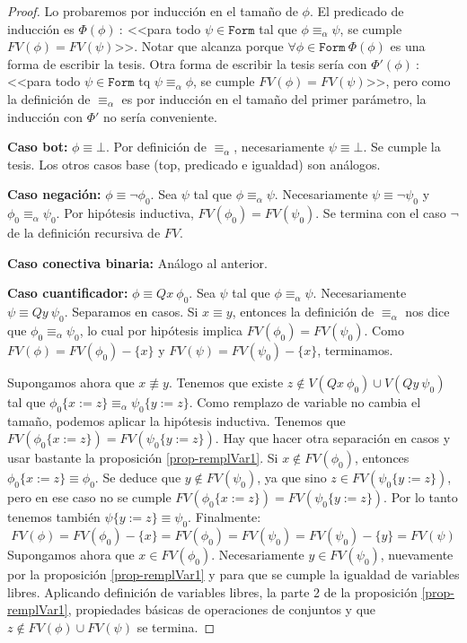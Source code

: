 \documentclass[a4paper, 12pt]{report}
\theoremstyle{definition}
\begin{document}
\begin{proof}
	Lo probaremos por inducción en el tamaño de $\phi$. El predicado de inducción es $\Phi(\phi)~:~$<<para todo $\psi\in\mathtt{Form}$ tal que $\phi\equiv_\alpha\psi$, se cumple $FV(\phi)=FV(\psi)$>>. Notar que alcanza porque $\forall \phi\in\mathtt{Form}~\Phi(\phi)$ es una forma de escribir la tesis. Otra forma de escribir la tesis sería con $\Phi'(\phi)~:~$<<para todo $\psi\in\mathtt{Form}$ tq $\psi\equiv_\alpha\phi$, se cumple $FV(\phi)=FV(\psi)$>>, pero como la definición de $\equiv_\alpha$ es por inducción en el tamaño del primer parámetro, la inducción con $\Phi'$ no sería conveniente.
	
	\textbf{Caso bot:} $\phi\equiv\bot$. Por definición de $\equiv_\alpha$, necesariamente $\psi\equiv\bot$. Se cumple la tesis. Los otros casos base (top, predicado e igualdad) son análogos.
	
	\textbf{Caso negación:} $\phi\equiv\lnot\phi_0$. Sea $\psi$ tal que $\phi\equiv_\alpha\psi$. Necesariamente $\psi\equiv \lnot\psi_0$ y $\phi_0\equiv_\alpha\psi_0$. Por hipótesis inductiva, $FV(\phi_0)=FV(\psi_0)$. Se termina con el caso $\lnot$ de la definición recursiva de $FV$.
	
	\textbf{Caso conectiva binaria:} Análogo al anterior.
	
	\textbf{Caso cuantificador:} $\phi\equiv Qx~\phi_0$. Sea $\psi$ tal que $\phi\equiv_\alpha\psi$. Necesariamente $\psi\equiv Qy~\psi_0$. Separamos en casos. Si $x\equiv y$, entonces la definición de $\equiv_\alpha$ nos dice que $\phi_0\equiv_\alpha\psi_0$, lo cual por hipótesis implica $FV(\phi_0)=FV(\psi_0)$. Como $FV(\phi) = FV(\phi_0)-\{x\}$ y $FV(\psi) = FV(\psi_0)-\{x\}$, terminamos.
	
	Supongamos ahora que $x\not\equiv y$. Tenemos que existe $z\not\in V(Qx~\phi_0)\cup V(Qy~\psi_0)$ tal que $\phi_0\{x:=z\}\equiv_\alpha\psi_0\{y:=z\}$. Como remplazo de variable no cambia el tamaño, podemos aplicar la hipótesis inductiva. Tenemos que $FV(\phi_0\{x:=z\})=FV(\psi_0\{y:=z\})$. Hay que hacer otra separación en casos y usar bastante la proposición \ref{prop-remplVar1}. Si $x\not\in FV(\phi_0)$, entonces $\phi_0\{x:=z\}\equiv\phi_0$. Se deduce que $y\not\in FV(\psi_0)$, ya que sino $z\in FV(\psi_0\{y:=z\})$, pero en ese caso no se cumple $FV(\phi_0\{x:=z\})=FV(\psi_0\{y:=z\})$. Por lo tanto tenemos también $\psi\{y:=z\}\equiv\psi_0$. Finalmente:
	$$ FV(\phi)= FV(\phi_0)-\{x\} = FV(\phi_0)=FV(\psi_0)=FV(\psi_0)-\{y\} = FV(\psi)
	$$
	Supongamos ahora que $x\in FV(\phi_0)$. Necesariamente $y\in FV(\psi_0)$, nuevamente por la proposición \ref{prop-remplVar1} y para que se cumple la igualdad de variables libres. Aplicando definición de variables libres, la parte 2 de la proposición \ref{prop-remplVar1}, propiedades básicas de operaciones de conjuntos y que $z\not\in FV(\phi)\cup FV(\psi)$ se termina.
\end{proof}
\end{document}
